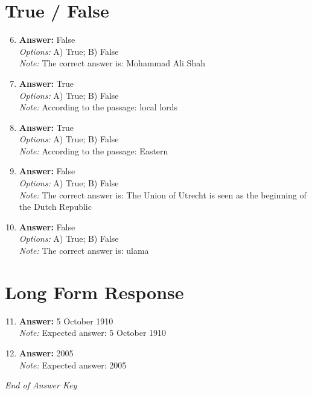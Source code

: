 \documentclass[12pt]{article}
\begin{document}
\section*{True / False}
\begin{enumerate}[label=\arabic*.]
\setcounter{enumi}{5}
\item \textbf{Answer:} False
\\ \textit{Options:} A) True; B) False
\\ \textit{Note:} The correct answer is: Mohammad Ali Shah
\item \textbf{Answer:} True
\\ \textit{Options:} A) True; B) False
\\ \textit{Note:} According to the passage: local lords
\item \textbf{Answer:} True
\\ \textit{Options:} A) True; B) False
\\ \textit{Note:} According to the passage: Eastern
\item \textbf{Answer:} False
\\ \textit{Options:} A) True; B) False
\\ \textit{Note:} The correct answer is: The Union of Utrecht is seen as the beginning of the Dutch Republic
\item \textbf{Answer:} False
\\ \textit{Options:} A) True; B) False
\\ \textit{Note:} The correct answer is: ulama
\end{enumerate}

\section*{Long Form Response}
\begin{enumerate}[label=\arabic*.]
\setcounter{enumi}{10}
\item \textbf{Answer:} 5 October 1910
\\ \textit{Note:} Expected answer: 5 October 1910
\item \textbf{Answer:} 2005
\\ \textit{Note:} Expected answer: 2005
\end{enumerate}

\vfill
\noindent\textit{End of Answer Key}
\end{document}
